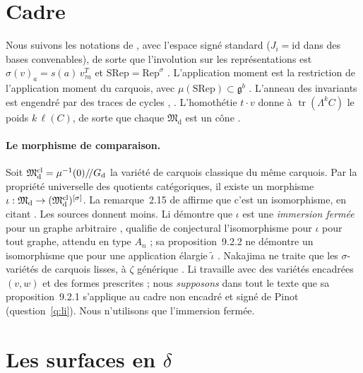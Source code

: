 \documentclass[11pt]{article}
\theoremstyle{definition}
\theoremstyle{remark}
\newcommand{\M}{\mathfrak{M}}\newcommand{\Rep}{\mathrm{Rep}}\newcommand{\SRep}{\mathrm{SRep}}
\begin{document}
\section{Cadre}\label{sec:setup}
Nous suivons les notations de \cite{Pin26}, avec l'espace signé standard ($J_i=\mathrm{id}$ dans des bases convenables), de sorte que l'involution sur les représentations est $\sigma(v)_a=s(a)\,v_{\tau a}^{T}$ et $\SRep=\Rep^\sigma$ \cite[déf.~2.3 et 2.5]{Pin26}. L'application moment est la restriction de l'application moment du carquois, avec $\mu(\SRep)\subset\mathfrak g^b$ \cite[cor.~2.13]{Pin26}. L'anneau des invariants est engendré par des traces de cycles \cite[th.~3.9]{Pin26}, \cite{LP90}. L'homothétie $t\cdot v$ donne à $\operatorname{tr}(\Lambda^kC)$ le poids $k\,\ell(C)$, de sorte que chaque $\M_{\mathrm d}$ est un cône \cite[\S3.5.1]{Pin26}.

\paragraph{Le morphisme de comparaison.} Soit $\M^{\rm cl}_{\mathrm d}=\mu^{-1}(0)/\!/G_{\mathrm d}$ la variété de carquois classique du même carquois. Par la propriété universelle des quotients catégoriques, il existe un morphisme $\iota:\M_{\mathrm d}\to(\M^{\rm cl}_{\mathrm d})^{[\sigma]}$. La remarque~2.15 de \cite{Pin26} affirme que c'est un isomorphisme, en citant \cite{Li19,Nak25}. Les sources donnent moins. Li démontre que $\iota$ est une \emph{immersion fermée} pour un graphe arbitraire \cite[prop.~9.2.1]{Li19}, qualifie de conjectural l'isomorphisme pour $\iota$ pour tout graphe, attendu en type $A_n$ \cite[rem.~9.2.3]{Li19} ; sa proposition~9.2.2 ne démontre un isomorphisme que pour une application élargie $\tilde\iota$ \cite[prop.~9.2.2]{Li19}. Nakajima ne traite que les $\sigma$-variétés de carquois lisses, à $\zeta$ générique \cite{Nak25}. Li travaille avec des variétés encadrées $(v,w)$ et des formes prescrites ; nous \emph{supposons} dans tout le texte que sa proposition~9.2.1 s'applique au cadre non encadré et signé de Pinot (question~\ref{q:li}). Nous n'utilisons que l'immersion fermée.

\section{Les surfaces en $\delta$}\label{sec:delta}
\end{document}
